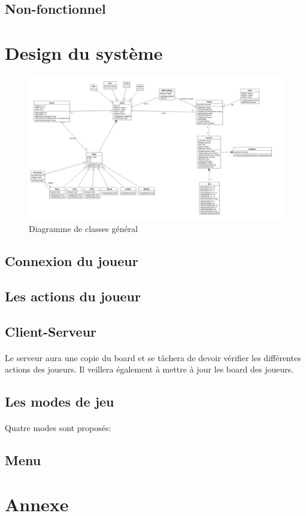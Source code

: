 \documentclass[10pt, a4paper]{article}
\begin{document}
		\subsection{Non-fonctionnel}
		
	\section{Design du système}
	
\begin{figure}[ht]
\centering
\includegraphics[scale=0.4]{ClassDiagram.png}
\caption{Diagramme de classes général}
\label{CD} %
\end{figure}
		
		\subsection{Connexion du joueur}
		
		\subsection{Les actions du joueur}
		
		\subsection{Client-Serveur}
		\paragraph{}Le serveur aura une copie du board et se tâchera de devoir vérifier les différentes actions des joueurs. Il veillera également à  mettre à jour les board des joueurs.
		\subsection{Les modes de jeu}
		\paragraph{}Quatre modes sont proposés:
		
		\subsection{Menu}
		
	\section{Annexe}
	
	
		
		
		
		
\end{document}
